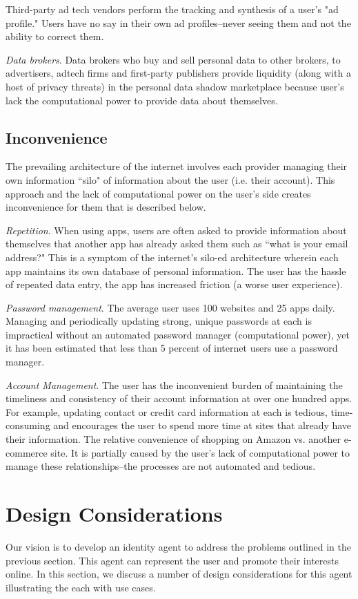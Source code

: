 \documentclass[11pt, oneside]{article}   	%
\begin{document}
Third-party ad tech vendors perform the tracking and synthesis of a user's "ad profile." Users have no say in their own ad profiles--never seeing them and not the ability to correct them.

\emph{Data brokers}. Data brokers who buy and sell personal data to other brokers, to advertisers, adtech firms and first-party publishers provide liquidity (along with a host of privacy threats) in the personal data shadow marketplace because user's lack the computational power to provide data about themselves.

\subsection{Inconvenience}
The prevailing architecture of the internet involves each provider managing their own  information ``silo" of information about the user (i.e. their account). This approach and the lack of computational power on the user's side creates inconvenience for them that is described below.

\emph{Repetition}. When using apps, users are often asked to provide information about themselves that another app has already asked them such as ``what is your email address?" This is a symptom of the internet's silo-ed architecture wherein each app maintains its own database of personal information. The user has the hassle of repeated data entry, the app has increased friction (a worse user experience).

\emph{Password management}. The average user uses 100 websites and 25 apps daily. Managing and periodically updating strong, unique passwords at each is  impractical without an automated password manager (computational power), yet it has been estimated that less than 5 percent of internet users use a password manager. 

\emph{Account Management}. The user has the inconvenient burden of maintaining the timeliness and consistency of their account information at over one hundred apps. For example, updating contact or credit card information at each is tedious, time-consuming and encourages the user to spend more time at sites that already have their information. The relative convenience of shopping on Amazon vs. another e-commerce site. It is partially caused by the user's lack of computational power to manage these relationships--the processes are not automated and tedious.

\section{Design Considerations}
Our vision is to develop an identity agent to address the problems outlined in the previous section. This agent  can represent the user and promote their interests online. In this section, we discuss a number of design considerations for this agent illustrating the each with use cases.
\end{document}
